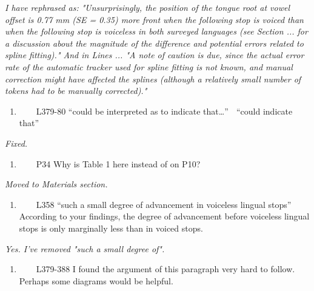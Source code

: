\documentclass[]{article}
\providecommand{\tightlist}{%
  \setlength{\itemsep}{0pt}\setlength{\parskip}{0pt}}
\begin{document}
\begin{adjustwidth}{1cm}{} \textit{
I have rephrased as: "Unsurprisingly, the position of the tongue root at vowel offset is 0.77 mm (SE = 0.35) more front when the following stop is voiced than when the following stop is voiceless in both surveyed languages (see Section ... for a discussion about the magnitude of the difference and potential errors related to spline fitting)." And in Lines ... "A note of caution is due, since the actual error rate of the automatic tracker used for spline fitting is not known, and manual correction might have affected the splines (although a relatively small number of tokens had to be manually corrected)."
} \end{adjustwidth}

\begin{enumerate}
\def\labelenumi{\arabic{enumi}.}
\setcounter{enumi}{16}
\tightlist
\item
  ~~~~L379-80 ``could be interpreted as to indicate that\ldots{}'' 
  ``could indicate that''
\end{enumerate}

\begin{adjustwidth}{1cm}{} \textit{
Fixed.
} \end{adjustwidth}

\begin{enumerate}
\def\labelenumi{\arabic{enumi}.}
\setcounter{enumi}{17}
\tightlist
\item
  ~~~~P34 Why is Table 1 here instead of on P10?
\end{enumerate}

\begin{adjustwidth}{1cm}{} \textit{
Moved to Materials section.
} \end{adjustwidth}

\begin{enumerate}
\def\labelenumi{\arabic{enumi}.}
\setcounter{enumi}{18}
\tightlist
\item
  ~~~~L358 ``such a small degree of advancement in voiceless lingual
  stops'' According to your findings, the degree of advancement before
  voiceless lingual stops is only marginally less than in voiced stops.
\end{enumerate}

\begin{adjustwidth}{1cm}{} \textit{
Yes. I've removed "such a small degree of".
} \end{adjustwidth}

\begin{enumerate}
\def\labelenumi{\arabic{enumi}.}
\setcounter{enumi}{19}
\tightlist
\item
  ~~~~L379-388 I found the argument of this paragraph very hard to
  follow. Perhaps some diagrams would be helpful.
\end{enumerate}
\end{document}
